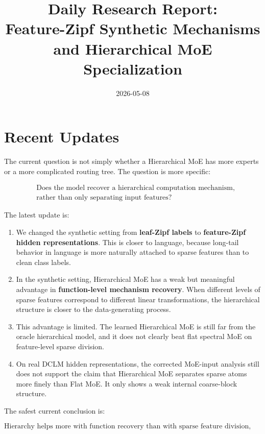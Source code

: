 \documentclass[11pt]{article}
\title{Daily Research Report:\\Feature-Zipf Synthetic Mechanisms and Hierarchical MoE Specialization}
\author{}
\date{2026-05-08}
\begin{document}
\maketitle

\section{Recent Updates}

The current question is not simply whether a Hierarchical MoE has more experts or a more complicated routing tree. The question is more specific:

$$
\begin{aligned}
&\text{Does the model recover a hierarchical computation mechanism,}\\
&\text{rather than only separating input features?}
\end{aligned}
$$

The latest update is:

\begin{enumerate}[leftmargin=1.5em]
    \item We changed the synthetic setting from \textbf{leaf-Zipf labels} to \textbf{feature-Zipf hidden representations}. This is closer to language, because long-tail behavior in language is more naturally attached to sparse features than to clean class labels.

    \item In the synthetic setting, Hierarchical MoE has a weak but meaningful advantage in \textbf{function-level mechanism recovery}. When different levels of sparse features correspond to different linear transformations, the hierarchical structure is closer to the data-generating process.

    \item This advantage is limited. The learned Hierarchical MoE is still far from the oracle hierarchical model, and it does not clearly beat flat spectral MoE on feature-level sparse division.

    \item On real DCLM hidden representations, the corrected MoE-input analysis still does not support the claim that Hierarchical MoE separates sparse atoms more finely than Flat MoE. It only shows a weak internal coarse-block structure.
\end{enumerate}

The safest current conclusion is:

$$
\text{Hierarchy helps more with function recovery than with sparse feature division, but only partially.}
$$
\end{document}
